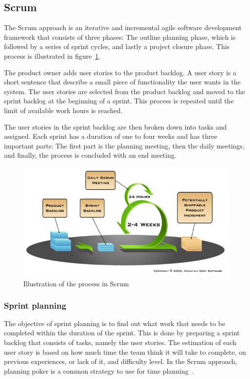 \newpage
\subsection{Scrum}

\label{sec:scrumProjectManagement}

The Scrum approach is an iterative and incremental agile software development
framework that consists of three phases: The outline planning phase, which is
followed by a series of sprint cycles, and lastly a project closure phase. This process is illustrated in figure~\ref{fig:scrumProcess}.

The product owner adds user stories to the product backlog. A user story is a short sentence that describe a small piece of functionality the user wants in the system. The user stories are selected from the product backlog and moved to the sprint backlog at the beginning of a sprint. This process is repeated until the limit of available work hours is reached. 

The user stories in the sprint backlog are then broken down into tasks and assigned. Each sprint has a duration of one to four weeks and has three important parts: The first part is the
planning meeting, then the daily  meetings, and finally, the process is
concluded with an end meeting. 
\begin{figure}[H]
\includegraphics[width=\textwidth]{ch/projectManagement/fig/sprintProcess.jpg}
\caption{Illustration of the process in Scrum}
\label{fig:scrumProcess}
\end{figure}


\subsubsection{Sprint planning}
\label{sec:sprintplanning}
The objective of sprint planning is to find out what work that needs to be completed within the duration of the sprint. This is done by preparing a sprint backlog that consists of tasks, namely the user stories. The estimation of each user story is based on how much time the team think it will take to complete, on previous experiences, or lack of it, and difficulty level. In the Scrum approach, planning poker is a common strategy to use for time planning~\cite{planningpoker}.

